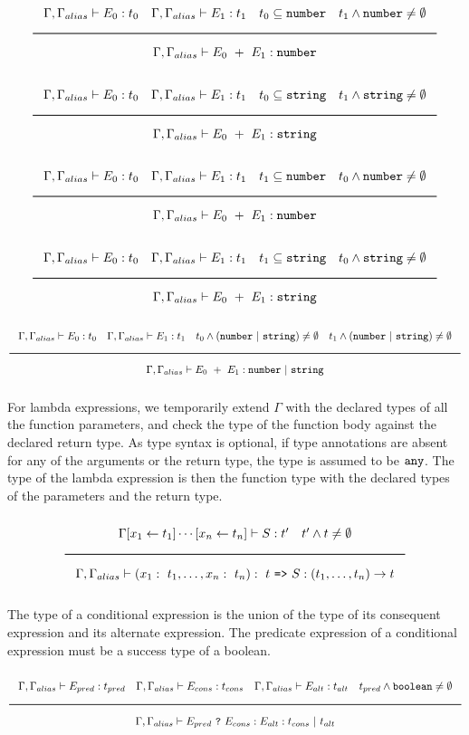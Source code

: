 \noindent
\[
  \Rule{\Gamma, \Gamma_{alias} \vdash E_0 : t_0 \quad \Gamma, \Gamma_{alias} \vdash E_1 : t_1 \quad t_0 \subseteq \Number
    \quad t_1 \wedge \Number \neq \emptyset}{\Gamma, \Gamma_{alias} \vdash E_0\ + \ E_1 : \Number}
\]
\noindent
\[
  \Rule{\Gamma, \Gamma_{alias} \vdash E_0 : t_0 \quad \Gamma, \Gamma_{alias} \vdash E_1 : t_1 \quad t_0 \subseteq \String
    \quad t_1 \wedge \String \neq \emptyset}{\Gamma, \Gamma_{alias} \vdash E_0\ + \ E_1 : \String}
\]
\noindent
\[
  \Rule{\Gamma, \Gamma_{alias} \vdash E_0 : t_0 \quad \Gamma, \Gamma_{alias} \vdash E_1 : t_1 \quad t_1 \subseteq \Number
    \quad t_0 \wedge \Number \neq \emptyset}{\Gamma, \Gamma_{alias} \vdash E_0\ + \ E_1 : \Number}
\]
\noindent
\[
  \Rule{\Gamma, \Gamma_{alias} \vdash E_0 : t_0 \quad \Gamma, \Gamma_{alias} \vdash E_1 : t_1 \quad t_1 \subseteq \String
    \quad t_0 \wedge \String \neq \emptyset}{\Gamma, \Gamma_{alias} \vdash E_0\ + \ E_1 : \String}
\]
\noindent
\[
  \Rule{\Gamma, \Gamma_{alias} \vdash E_0 : t_0 \quad \Gamma, \Gamma_{alias} \vdash E_1 : t_1 \quad t_0 \wedge (\Number\ |\ \String) \neq \emptyset
    \quad t_1 \wedge (\Number\ |\ \String) \neq \emptyset}{\Gamma, \Gamma_{alias} \vdash E_0\ + \ E_1 : \Number\ |\ \String}
\]
\noindent

For lambda expressions, we temporarily extend $\Gamma$ with the declared types of all the function parameters,
and check the type of the function body against the declared return type.
As type syntax is optional, if type annotations are absent for any of the arguments or the return type, the type is assumed to be $\texttt{any}$.
The type of the lambda expression is then the function type with the declared types of the parameters and the return type. 

\noindent
\[
  \Rule{\Gamma [x_1 \leftarrow t_1] \cdots [x_n \leftarrow t_n] \vdash S : t' \quad t' \wedge t \neq \emptyset}{
    \Gamma, \Gamma_{alias} \vdash (x_1:\ t_1, \ldots, x_n:\ t_n) :\ t\ \texttt{=>}\ S : (t_1, \ldots, t_n) \rightarrow t}  
\]
\noindent

The type of a conditional expression is the union of the type of its consequent expression and its alternate expression.
The predicate expression of a conditional expression must be a success type of a boolean.

\noindent
\[
  \Rule{\Gamma, \Gamma_{alias} \vdash E_{pred} : t_{pred} \quad \Gamma, \Gamma_{alias} \vdash E_{cons} : t_{cons} \quad \Gamma, \Gamma_{alias} \vdash E_{alt} : t_{alt}
    \quad t_{pred} \wedge \Bool \neq \emptyset}{\Gamma, \Gamma_{alias} \vdash E_{pred}\ \texttt{?}\ E_{cons} : E_{alt} : t_{cons}\ |\ t_{alt}}
\]
\noindent

